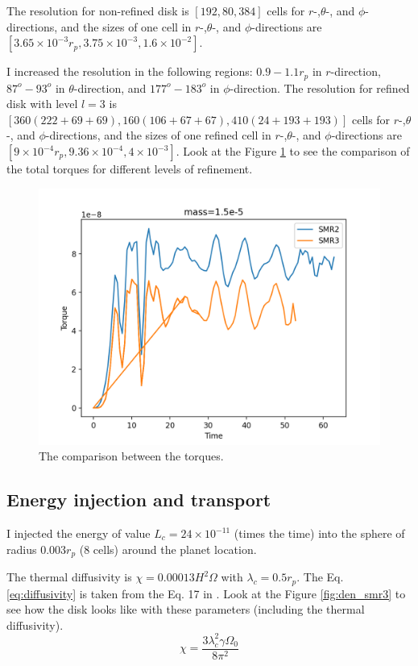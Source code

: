 \documentclass[twocolumn]{aastex631}
\begin{document}
The resolution for non-refined disk is $[192,80,384]$ cells for $r$-,$\theta$-, and $\phi$-directions, and the sizes of one cell in $r$-,$\theta$-, and $\phi$-directions are $[3.65\times 10^{-3}r_p, 3.75\times 10^{-3}, 1.6\times 10^{-2}]$. 

I increased the resolution in the following regions: $0.9-1.1 r_p$ in $r$-direction, $87^o-93^o$ in $\theta$-direction, and $177^o-183^o$ in $\phi$-direction. The resolution for refined disk with level $l=3$ is $[360 (222+69+69),160 (106+67+67),410 (24+193+193)]$ cells for $r$-,$\theta$-, and $\phi$-directions, and the sizes of one refined cell in $r$-,$\theta$-, and $\phi$-directions are $[9\times 10^{-4}r_p, 9.36\times 10^{-4}, 4\times 10^{-3}]$.
Look at the Figure \ref{fig:twotorques} to see the comparison of the total torques for different levels of refinement.
\begin{figure}
\centering
	\includegraphics[width=0.6\columnwidth]{comparison_torques.png}
    \caption{The comparison between the torques.}
    \label{fig:twotorques}
\end{figure}



\subsection{Energy injection and transport}
I injected the energy of value $L_c=24\times 10^{-11}$ (times the time) into the sphere of radius $0.003 r_p$ (8 cells) around the planet location.

The thermal diffusivity is $\chi=0.00013 H^2\Omega$ with $\lambda_c=0.5r_p$. The Eq. \ref{eq:diffusivity} is taken from the Eq. 17 in \citet{hankla20}. 
Look at the Figure \ref{fig:den_smr3} to see how the disk looks like with these parameters (including the thermal diffusivity). 
\begin{equation}\label{eq:diffusivity}
    \chi=\frac{3\lambda_c^2\gamma\Omega_0}{8\pi^2}
\end{equation}
\end{document}
